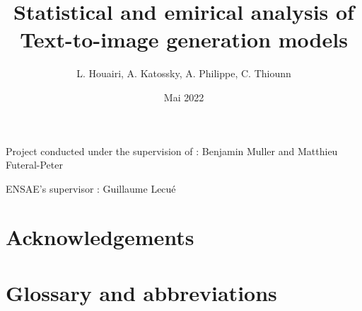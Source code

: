 \documentclass{article}
\title{Statistical and emirical analysis of Text-to-image generation models}
\author{L. Houairi,
A. Katossky,
A. Philippe,
C. Thiounn }
\date{Mai 2022}
\begin{document}
\begin{titlepage}
\maketitle

Project conducted under the supervision of : Benjamin Muller and Matthieu Futeral-Peter 

ENSAE's supervisor : Guillaume Lecué
\end{titlepage}

\renewcommand*\contentsname{Table of Contents}
\tableofcontents

\pagebreak
{} %
\section*{Acknowledgements} 

\pagebreak
{}
{}
\section*{Glossary and abbreviations}
\end{document}
